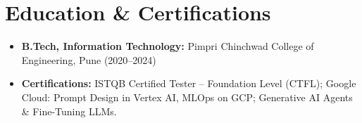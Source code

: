 \documentclass[a4paper,9.5pt]{article}
\begin{document}
\section{Education \& Certifications}
\begin{itemize}\small
\item \textbf{B.Tech, Information Technology:} Pimpri Chinchwad College of Engineering, Pune (2020--2024)
\item \textbf{Certifications:} ISTQB Certified Tester -- Foundation Level (CTFL); Google Cloud: Prompt Design in Vertex AI, MLOps on GCP; Generative AI Agents \& Fine-Tuning LLMs.
\end{itemize}
\end{document}
